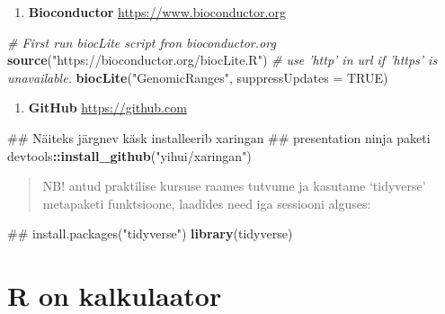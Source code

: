 \documentclass[]{book}
\newenvironment{Shaded}{\begin{snugshade}}{\end{snugshade}}
\newcommand{\KeywordTok}[1]{\textcolor[rgb]{0.13,0.29,0.53}{\textbf{#1}}}
\newcommand{\DataTypeTok}[1]{\textcolor[rgb]{0.13,0.29,0.53}{#1}}
\newcommand{\StringTok}[1]{\textcolor[rgb]{0.31,0.60,0.02}{#1}}
\newcommand{\CommentTok}[1]{\textcolor[rgb]{0.56,0.35,0.01}{\textit{#1}}}
\newcommand{\OtherTok}[1]{\textcolor[rgb]{0.56,0.35,0.01}{#1}}
\newcommand{\OperatorTok}[1]{\textcolor[rgb]{0.81,0.36,0.00}{\textbf{#1}}}
\newcommand{\NormalTok}[1]{#1}
\providecommand{\tightlist}{%
  \setlength{\itemsep}{0pt}\setlength{\parskip}{0pt}}
\begin{document}
\begin{enumerate}
\def\labelenumi{\arabic{enumi}.}
\setcounter{enumi}{1}
\tightlist
\item
  \textbf{Bioconductor} \url{https://www.bioconductor.org}
\end{enumerate}

\begin{Shaded}
\begin{Highlighting}[]
\CommentTok{# First run biocLite script fron bioconductor.org}
\KeywordTok{source}\NormalTok{(}\StringTok{"https://bioconductor.org/biocLite.R"}\NormalTok{)  }
\CommentTok{# use 'http' in url if 'https' is unavailable. }
\KeywordTok{biocLite}\NormalTok{(}\StringTok{"GenomicRanges"}\NormalTok{, }\DataTypeTok{suppressUpdates =} \OtherTok{TRUE}\NormalTok{)}
\end{Highlighting}
\end{Shaded}

\begin{enumerate}
\def\labelenumi{\arabic{enumi}.}
\setcounter{enumi}{2}
\tightlist
\item
  \textbf{GitHub} \url{https://github.com}
\end{enumerate}

\begin{Shaded}
\begin{Highlighting}[]
\NormalTok{## Näiteks järgnev käsk installeerib xaringan }
\NormalTok{## presentation ninja paketi}
\NormalTok{devtools}\OperatorTok{::}\KeywordTok{install_github}\NormalTok{(}\StringTok{"yihui/xaringan"}\NormalTok{)}
\end{Highlighting}
\end{Shaded}

\begin{quote}
NB! antud praktilise kursuse raames tutvume ja kasutame `tidyverse'
metapaketi funktsioone, laadides need iga sessiooni alguses:
\end{quote}

\begin{Shaded}
\begin{Highlighting}[]
\NormalTok{## install.packages("tidyverse")}
\KeywordTok{library}\NormalTok{(tidyverse)}
\end{Highlighting}
\end{Shaded}

\chapter{R on kalkulaator}\label{r-on-kalkulaator}
\end{document}
